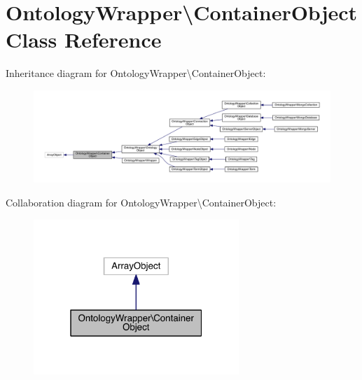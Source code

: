 \hypertarget{class_ontology_wrapper_1_1_container_object}{\section{Ontology\-Wrapper\textbackslash{}Container\-Object Class Reference}
\label{class_ontology_wrapper_1_1_container_object}
}


Inheritance diagram for Ontology\-Wrapper\textbackslash{}Container\-Object\-:\nopagebreak
\begin{figure}[H]
\begin{center}
\leavevmode
\includegraphics[width=350pt]{class_ontology_wrapper_1_1_container_object__inherit__graph}
\end{center}
\end{figure}


Collaboration diagram for Ontology\-Wrapper\textbackslash{}Container\-Object\-:\nopagebreak
\begin{figure}[H]
\begin{center}
\leavevmode
\includegraphics[width=220pt]{class_ontology_wrapper_1_1_container_object__coll__graph}
\end{center}
\end{figure}
